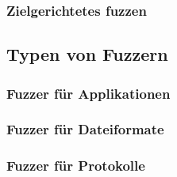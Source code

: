 \subsubsection{Zielgerichtetes fuzzen}
\subsection{Typen von Fuzzern}\label{subsec:typen-von-fuzzern}
\subsubsection{Fuzzer für Applikationen}
\subsubsection{Fuzzer für Dateiformate}
\subsubsection{Fuzzer für Protokolle}